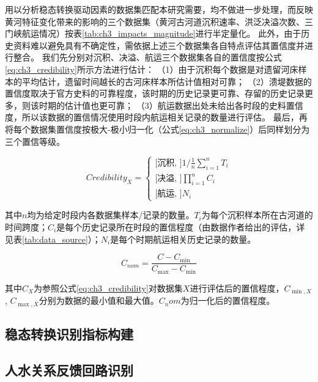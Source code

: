 用以分析稳态转换驱动因素的数据集匹配本研究需要，均不做进一步处理，而反映黄河特征变化带来的影响的三个数据集（黄河古河道沉积速率、洪泛决溢次数、三门峡航运情况）按表\ref{tab:ch3_impacts_magnitude}进行半定量化。
此外，由于历史资料难以避免具有不确定性，需依据上述三个数据集各自特点评估其置信度并进行整合。
我们先分别对沉积、决溢、航运三个数据集各自的置信度按公式\ref{eq:ch3_credibility}所示方法进行估计：
（1）由于沉积每个数据是对遗留河床样本的平均估计，遗留时间越长的古河床样本所估计值相对可靠；
（2）溃堤数据的置信度取决于官方史料的可靠程度，该时期的历史记录更可靠、存留的历史记录更多，则该时期的估计值也更可靠；
（3）航运数据出处未给出各时段的史料置信度，所以该数据的置信情况使用时段内航运相关记录的数量进行评估。
最后，再将每个数据集置信度按极大-极小归一化（公式\ref{eq:ch3_normalize}）后同样划分为三个置信等级。



\begin{equation}
    \label{eq:ch3_credibility}
    Credibility_X = 
    \left\{\begin{array}{l}
        \text{[沉积, ]} 1 / \frac{1}{n} \sum_{i=1}^n T_i\\
        \text{[决溢, ]} \prod_{i=1}^n C_i\\
        \text{[航运, ]} N_i
    \end{array}\right.
\end{equation}

其中$n$均为给定时段内各数据集样本/记录的数量。$T_i$为每个沉积样本所在古河道的时间跨度；$C_i$是每个历史记录所在时段的置信程度（由数据作者给出的评估，详见表\ref{tab:data_source}）；$N_i$是每个时期航运相关历史记录的数量。

\begin{equation}
    \label{eq:ch3_normalize}
    C_{nom}=\frac{C-C_{\min}}{C_{\max}-C_{\min}}
\end{equation}

其中$C_{X}$为参照公式\ref{eq:ch3_credibility}对数据集$X$进行评估后的置信程度，$C_{\min, X}$, $C_{\max, X}$分别为数据的最小值和最大值。$C_nom$为归一化后的置信程度。

\subsection{稳态转换识别指标构建}

\subsection{人水关系反馈回路识别}
